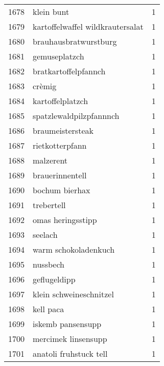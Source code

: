 \begin{tabular}{llr}
1678 &                                         klein bunt &      1 \\
1679 &                   kartoffelwaffel wildkrautersalat &      1 \\
1680 &                              brauhausbratwurstburg &      1 \\
1681 &                                      gemuseplatzch &      1 \\
1682 &                               bratkartoffelpfannch &      1 \\
1683 &                                             crèmig &      1 \\
1684 &                                   kartoffelplatzch &      1 \\
1685 &                            spatzlewaldpilzpfannnch &      1 \\
1686 &                                   braumeistersteak &      1 \\
1687 &                                    rietkotterpfann &      1 \\
1688 &                                          malzerent &      1 \\
1689 &                                    brauerinnentell &      1 \\
1690 &                                     bochum bierhax &      1 \\
1691 &                                         trebertell &      1 \\
1692 &                                  omas heringsstipp &      1 \\
1693 &                                            seelach &      1 \\
1694 &                               warm schokoladenkuch &      1 \\
1695 &                                           nussbech &      1 \\
1696 &                                       geflugeldipp &      1 \\
1697 &                            klein schweineschnitzel &      1 \\
1698 &                                          kell paca &      1 \\
1699 &                                  iskemb pansensupp &      1 \\
1700 &                                mercimek linsensupp &      1 \\
1701 &                             anatoli fruhstuck tell &      1 \\

\end{tabular}
